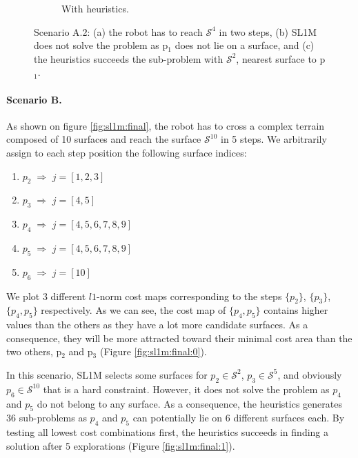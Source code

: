 \begin{figure}[ht]
\begin{subfigure}[t]{0.48\linewidth}
    \caption{With heuristics.}
    \label{fig:sl1m:a12:1}
    \end{subfigure}
    \caption{Scenario A.2: (a) the robot has to reach $\mathcal{S}^4$ in two steps, (b) SL1M does not solve the problem as p$_1$ does not lie on a surface, and (c) the heuristics succeeds the sub-problem with $\mathcal{S}^2$, nearest surface to p$_1$.}
    \label{fig:sl1m:a12}
\end{figure}



\paragraph{Scenario B.}
As shown on figure \ref{fig:sl1m:final}, the robot has to cross a complex terrain composed of 10 surfaces and reach the surface $\mathcal{S}^{10}$ in 5 steps. 
We arbitrarily assign to each step position the following surface indices:
\begin{enumerate}
    \item $p_2 \; \Rightarrow$ \; $j = [1,2,3]$
    \item $p_3 \; \Rightarrow$ \; $j = [4,5]$
    \item $p_4 \; \Rightarrow$ \; $j = [4,5,6,7,8,9]$
    \item $p_5 \; \Rightarrow$ \; $j = [4,5,6,7,8,9]$
    \item $p_6 \; \Rightarrow$ \; $j = [10]$
\end{enumerate}
We plot 3 different $l1$-norm cost maps corresponding to the steps $\{p_2\}$, $\{p_3\}$, $\{p_4,p_5\}$ respectively.
As we can see, the cost map of $\{p_4,p_5\}$ contains higher values than the others as they have a lot more candidate surfaces. 
As a consequence, they will be more attracted toward their minimal cost area than the two others, p$_2$ and p$_3$ (Figure \ref{fig:sl1m:final:0}).

In this scenario, SL1M selects some surfaces for $p_2 \in \mathcal{S}^2$, $p_3 \in \mathcal{S}^5$, and obviously $p_6 \in \mathcal{S}^{10}$ that is a hard constraint. 
However, it does not solve the problem as $p_4$ and $p_5$ do not belong to any surface.
As a consequence, the heuristics generates 36 sub-problems as $p_4$ and $p_5$ can potentially lie on 6 different surfaces each. 
By testing all lowest cost combinations first, the heuristics succeeds in finding a solution after 5 explorations (Figure \ref{fig:sl1m:final:1}).

